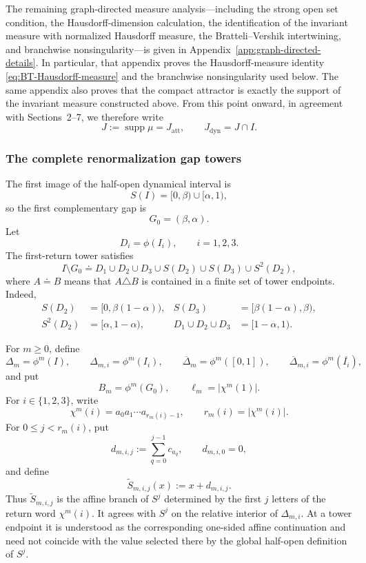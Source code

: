 \documentclass[11pt]{amsart}
\theoremstyle{plain}
\theoremstyle{definition}
\theoremstyle{remark}
\DeclareMathOperator{\supp}{supp}
\begin{document}
The remaining graph-directed measure analysis---including the strong open set
condition, the Hausdorff-dimension calculation, the identification of the
invariant measure with normalized Hausdorff measure, the Bratteli--Vershik
intertwining, and branchwise nonsingularity---is given in
Appendix~\ref{app:graph-directed-details}.  In particular, that appendix proves
the Hausdorff-measure identity \eqref{eq:BT-Hausdorff-measure} and the
branchwise nonsingularity used below.
The same appendix also proves that the compact attractor is exactly the support of the
invariant measure constructed above. From this point onward, in agreement with Sections~2--7,
we therefore write
\[
        J:=\supp\mu=J_{\mathrm{att}},
        \qquad
        J_{\mathrm{dyn}}=J\cap I.
\]

\subsubsection{The complete renormalization gap towers}

The first image of the half-open dynamical interval is
\[
        S(I)=[0,\beta)\cup[\alpha,1),
\]
so the first complementary gap is
\[
        G_0=(\beta,\alpha).
\tag{8.13}
\label{eq:BT-first-gap}
\]
Let
\[
        D_i=\phi(I_i),
        \qquad i=1,2,3.
\]
The first-return tower satisfies
\[
I\setminus G_0
\doteq
D_1\cup D_2\cup D_3
\cup S(D_2)\cup S(D_3)\cup S^2(D_2),
\tag{8.14}
\label{eq:BT-first-tower}
\]
where \(A\doteq B\) means that \(A\triangle B\) is contained in a finite set of tower
endpoints. Indeed,
\[
\begin{aligned}
S(D_2)&=[0,\beta(1-\alpha)),&
S(D_3)&=[\beta(1-\alpha),\beta),\\
S^2(D_2)&=[\alpha,1-\alpha),&
D_1\cup D_2\cup D_3&=[1-\alpha,1).
\end{aligned}
\]

For \(m\geq0\), define
\[
        \Delta_m=\phi^m(I),
        \qquad
        \Delta_{m,i}=\phi^m(I_i),
        \qquad
        \overline{\Delta}_m=\phi^m([0,1]),
        \qquad
        \overline{\Delta}_{m,i}=\phi^m(\overline{I_i}),
\]
and put
\[
        B_m=\phi^m(G_0),
        \qquad
        \ell_m=|\chi^m(1)|.
\]
For \(i\in\{1,2,3\}\), write
\[
        \chi^m(i)
        =
        a_0a_1\cdots a_{r_m(i)-1},
        \qquad
        r_m(i)=|\chi^m(i)|.
\]
For \(0\leq j<r_m(i)\), put
\[
        d_{m,i,j}
        :=
        \sum_{q=0}^{j-1}c_{a_q},
        \qquad
        d_{m,i,0}=0,
\]
and define
\[
        \widetilde S_{m,i,j}(x)
        :=
        x+d_{m,i,j}.
\]
Thus \(\widetilde S_{m,i,j}\) is the affine branch of \(S^j\)
determined by the first \(j\) letters of the return word
\(\chi^m(i)\). It agrees with \(S^j\) on the relative interior of
\(\Delta_{m,i}\). At a tower endpoint it is understood as the
corresponding one-sided affine continuation and need not coincide with
the value selected there by the global half-open definition of \(S^j\).
\end{document}
